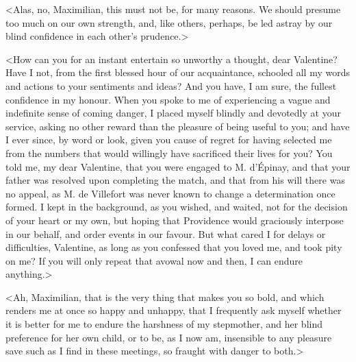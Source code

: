  <Alas, no, Maximilian, this must not be, for many reasons. We should presume too much on our own strength, and, like others, perhaps, be led astray by our blind confidence in each other's prudence.> 

 <How can you for an instant entertain so unworthy a thought, dear Valentine? Have I not, from the first blessed hour of our acquaintance, schooled all my words and actions to your sentiments and ideas? And you have, I am sure, the fullest confidence in my honour. When you spoke to me of experiencing a vague and indefinite sense of coming danger, I placed myself blindly and devotedly at your service, asking no other reward than the pleasure of being useful to you; and have I ever since, by word or look, given you cause of regret for having selected me from the numbers that would willingly have sacrificed their lives for you? You told me, my dear Valentine, that you were engaged to M. d'Épinay, and that your father was resolved upon completing the match, and that from his will there was no appeal, as M. de Villefort was never known to change a determination once formed. I kept in the background, as you wished, and waited, not for the decision of your heart or my own, but hoping that Providence would graciously interpose in our behalf, and order events in our favour. But what cared I for delays or difficulties, Valentine, as long as you confessed that you loved me, and took pity on me? If you will only repeat that avowal now and then, I can endure anything.> 

 <Ah, Maximilian, that is the very thing that makes you so bold, and which renders me at once so happy and unhappy, that I frequently ask myself whether it is better for me to endure the harshness of my stepmother, and her blind preference for her own child, or to be, as I now am, insensible to any pleasure save such as I find in these meetings, so fraught with danger to both.> 

